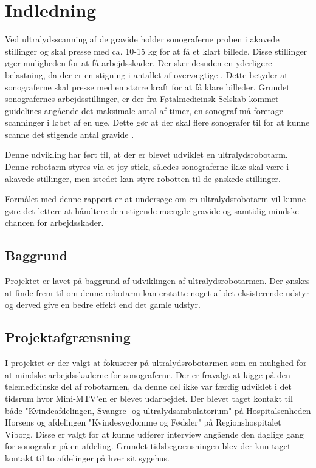 \chapter{Indledning} 
Ved ultralydsscanning af de gravide holder sonograferne proben i akavede stillinger og skal presse med ca. 10-15 kg for at få et klart billede. Disse stillinger øger muligheden for at få arbejdsskader. Der sker desuden en yderligere belastning, da der er en stigning i antallet af overvægtige \cite{Overvaegt}. Dette betyder at sonograferne skal presse med en større kraft for at få klare billeder. Grundet sonografernes arbejdsstillinger, er der fra Føtalmedicinsk Selskab kommet guidelines angående det maksimale antal af timer, en sonograf må foretage scanninger i løbet af en uge. Dette gør at der skal flere sonografer til for at kunne scanne det stigende antal gravide \cite{Foedsler}.

Denne udvikling har ført til, at der er blevet udviklet en ultralydsrobotarm. Denne robotarm styres via et joy-stick, således sonograferne ikke skal være i akavede stillinger, men istedet kan styre robotten til de ønskede stillinger. 

Formålet med denne rapport er at undersøge om en ultralydsrobotarm vil kunne gøre det lettere at håndtere den stigende mængde gravide og samtidig mindske chancen for arbejdsskader.  

\section{Baggrund}
Projektet er lavet på baggrund af udviklingen af ultralydsrobotarmen. Der ønskes at finde frem til om denne robotarm kan erstatte noget af det eksisterende udstyr og derved give en bedre effekt end det gamle udstyr.

\section{Projektafgrænsning}
 I projektet er der valgt at fokuserer på ultralydsrobotarmen som en mulighed for at mindske arbejdsskaderne for sonograferne. Der er fravalgt at kigge på den telemedicinske del af robotarmen, da denne del ikke var færdig udviklet i det tidsrum hvor Mini-MTV'en er blevet udarbejdet.  
 Der blevet taget kontakt til både "Kvindeafdelingen, Svangre- og ultralydsambulatorium" på Hospitalsenheden Horsens og afdelingen "Kvindesygdomme og Fødsler" på Regionshospitalet Viborg. Disse er valgt for at kunne udfører interview angående den daglige gang for sonografer på en afdeling. Grundet tidsbegrænsningen blev der kun taget kontakt til to afdelinger på hver sit sygehus. 

\label{version_Systemark}
